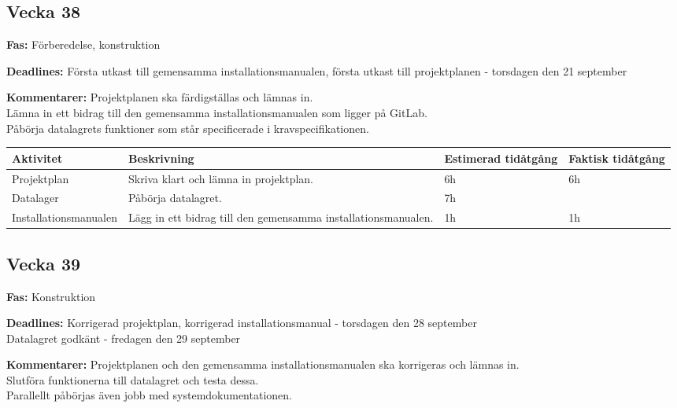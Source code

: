 \documentclass{TDP003mall}
\begin{document}
\subsection{Vecka 38}

\textbf{Fas:} Förberedelse, konstruktion

\textbf{Deadlines:} Första utkast till gemensamma installationsmanualen, första utkast till projektplanen - torsdagen den 21 september

\textbf{Kommentarer:}
Projektplanen ska färdigställas och lämnas in.\\
Lämna in ett bidrag till den gemensamma installationsmanualen som ligger på GitLab.\\
Påbörja datalagrets funktioner som står specificerade i kravspecifikationen.\\

\begin{table}[H]
\renewcommand{\arraystretch}{1.5}
\begin{tabularx}{\linewidth}{|l|X|l|l|}
\hline
\textbf{Aktivitet} & \textbf{Beskrivning} & \textbf{Estimerad tidåtgång} & \textbf{Faktisk tidåtgång}\\
\hline
Projektplan & Skriva klart och lämna in projektplan. & 6h  & 6h \\
\hline
Datalager & Påbörja datalagret. & 7h & \\
\hline
Installationsmanualen & Lägg in ett bidrag till den gemensamma installationsmanualen. & 1h & 1h \\
\hline



\end{tabularx}
\end{table}

\subsection{Vecka 39}

\textbf{Fas:} Konstruktion

\textbf{Deadlines:} Korrigerad projektplan, korrigerad installationsmanual - torsdagen den 28 september\\
Datalagret godkänt - fredagen den 29 september

\textbf{Kommentarer:}
Projektplanen och den gemensamma installationsmanualen ska korrigeras och lämnas in.\\
Slutföra funktionerna till datalagret och testa dessa.\\
Parallellt påbörjas även jobb med systemdokumentationen.
\end{document}
